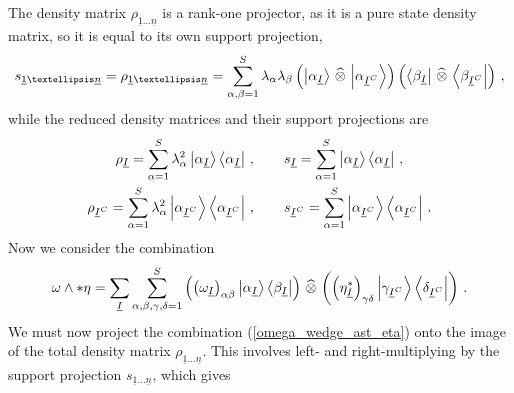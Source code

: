 \documentclass[12pt]{article}
\newcommand{\ul}[1]{{\underline{#1}}}
\newcommand{\wotimes}{ \, \widehat{\otimes} \, }
\numberwithin{equation}{section}
\newcommand{\soneton}{{s_{\ul{1} \ldots \ul{n}}}}
\newcommand{\rhooneton}{{\rho_{\ul{1} \ldots \ul{n}}}}
\begin{document}
The density matrix $\rhooneton$ is a rank-one projector, as it is a pure state density matrix, so it is equal to its own support projection,
%
\begin{align}\label{schmidt_for_inner_product}
    \soneton = \rhooneton = \sum_{\alpha, \beta = 1}^{S} \lambda_\alpha \lambda_\beta \left( \ket{\alpha_{\ul{I}}} \wotimes \ket{\alpha_{\ul{I}^C}} \right) \left( \bra{\beta_{\ul{I}}} \wotimes \bra{\beta_{\ul{I}^C}} \right) \, ,
\end{align}
%
while the reduced density matrices and their support projections are
%
\begin{gather}
    \rho_{\ul{I}} = \sum_{\alpha = 1}^{S} \lambda_\alpha^2 \ket{\alpha_{\ul{I}}} \bra{\alpha_{\ul{I}}} \, , \qquad s_{\ul{I}} = \sum_{\alpha = 1}^{S}  \ket{\alpha_{\ul{I}}} \bra{\alpha_{\ul{I}}} \, , \nonumber \\
    \rho_{\ul{I}^C} = \sum_{\alpha = 1}^{S} \lambda_\alpha^2 \ket{\alpha_{\ul{I}^C}} \bra{\alpha_{\ul{I}^C}} \, , \qquad s_{\ul{I}^C} = \sum_{\alpha = 1}^{S}  \ket{\alpha_{\ul{I}^C}} \bra{\alpha_{\ul{I}^C}} \, .
\end{gather}
%
Now we consider the combination
%
\begin{align}\label{omega_wedge_ast_eta}
    \omega \wedge \ast \eta = \sum_{\ul{I}} \sum_{\alpha, \beta, \gamma , \delta = 1}^{S} \left( \left( \omega_{\ul{I}} \right)_{\alpha \beta} \ket{\alpha_{\ul{I}}} \bra{\beta_{\ul{I}}} \right) \wotimes \left(  \left( \eta^\ast_{\ul{I}} \right)_{\gamma \delta} \ket{ \gamma_{\ul{I}^C } } \bra{\delta_{\ul{I}^C}} \right) \, .
\end{align}
%
We must now project the combination (\ref{omega_wedge_ast_eta}) onto the image of the total density matrix $\rhooneton$. This involves left- and right-multiplying by the support projection $\soneton$, which gives
%
\end{document}
